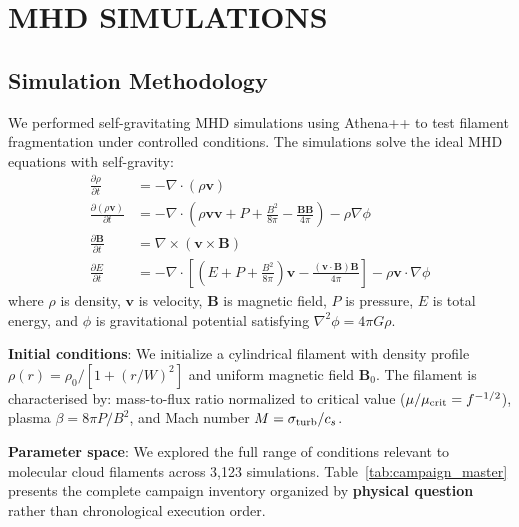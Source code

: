 \documentclass[twocolumn,usenatbib]{mnras}
\begin{document}
\section{MHD SIMULATIONS}

\subsection{Simulation Methodology}
\label{sec:methodology}

We performed self-gravitating MHD simulations using Athena++ \citep{Stone2020} to test filament fragmentation under controlled conditions. The simulations solve the ideal MHD equations with self-gravity:
\begin{align}
\frac{\partial \rho}{\partial t} &= -\nabla \cdot (\rho \mathbf{v}) \\
\frac{\partial (\rho \mathbf{v})}{\partial t} &= -\nabla \cdot \left(\rho \mathbf{v} \mathbf{v} + P + \frac{B^2}{8\pi} - \frac{\mathbf{B}\mathbf{B}}{4\pi}\right) - \rho \nabla \phi \\
\frac{\partial \mathbf{B}}{\partial t} &= \nabla \times (\mathbf{v} \times \mathbf{B}) \\
\frac{\partial E}{\partial t} &= -\nabla \cdot \left[(E + P + \frac{B^2}{8\pi})\mathbf{v} - \frac{(\mathbf{v} \cdot \mathbf{B})\mathbf{B}}{4\pi}\right] - \rho \mathbf{v} \cdot \nabla \phi
\end{align}
where $\rho$ is density, $\mathbf{v}$ is velocity, $\mathbf{B}$ is magnetic field, $P$ is pressure, $E$ is total energy, and $\phi$ is gravitational potential satisfying $\nabla^2 \phi = 4\pi G\rho$.

\textbf{Initial conditions}: We initialize a cylindrical filament with density profile $\rho(r) = \rho_0 / [1 + (r/W)^2]$ and uniform magnetic field $\mathbf{B}_0$. The filament is characterised by: mass-to-flux ratio normalized to critical value ($\mu/\mu_{\rm crit} = f^{-1/2}$), plasma $\beta = 8\pi P/B^2$, and Mach number $M = \sigma_{\rm turb}/c_s$.

\textbf{Parameter space}: We explored the full range of conditions relevant to molecular cloud filaments across 3,123 simulations. Table~\ref{tab:campaign_master} presents the complete campaign inventory organized by \textbf{physical question} rather than chronological execution order.
\end{document}
